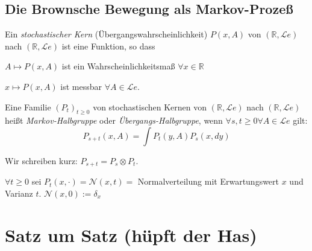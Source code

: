 \documentclass[a4paper,twoside,DIV15,BCOR12mm]{scrbook}
\begin{document}
\section{Die Brownsche Bewegung als Markov-Prozeß}
\begin{definition}
  Ein \emph{stochastischer Kern} (Übergangswahrscheinlichkeit) $P(x,A)$ von $(\mathbb R, \mathcal Le)$ nach $(\mathbb R, \mathcal Le)$ ist eine Funktion, so dass
  \begin{enuma}
  \item $A\mapsto P(x,A)$ ist ein Wahrscheinlichkeitsmaß $\forall x\in\mathbb R$
  \item $x\mapsto P(x,A)$ ist messbar $\forall A\in\mathcal Le$.
  \end{enuma}
\end{definition}
\begin{definition}
    Eine Familie $(P_t)_{t\geq 0}$ von stochastischen Kernen von $(\mathbb R, \mathcal Le)$ nach $(\mathbb R, \mathcal Le)$ heißt \emph{Markov-Halbgruppe} oder \emph{Übergangs-Halbgruppe}, wenn $\forall s,t\geq 0\forall A\in\mathcal Le$ gilt:
\[
P_{s+t}(x,A)=\int P_t(y,A)P_s(x,dy)
\]
\end{definition}
\begin{bemerkung}
  Wir schreiben kurz: $P_{s+t}=P_s\otimes P_t$.
\end{bemerkung}
\begin{beispiel}
  $\forall t\geq0$ sei $P_t(x,\cdot)=\mathcal N(x,t)=$ Normalverteilung mit Erwartungswert $x$ und Varianz $t$. $\mathcal N(x,0):=\delta_x$
\end{beispiel}

\chapter{Satz um Satz (hüpft der Has)}

\renewcommand{\indexname}{Stichwortverzeichnis}
\addtocounter{chapter}{1}
\printindex
\end{document}
